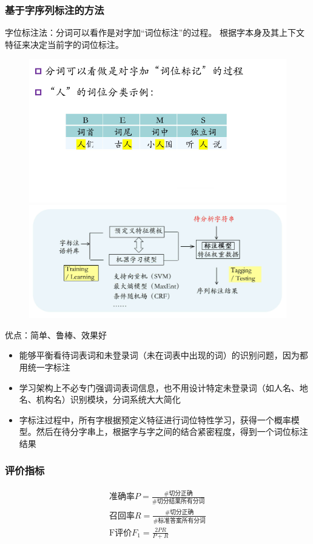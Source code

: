 \subsubsection{基于字序列标注的方法}
字位标注法：分词可以看作是对字加``词位标注''的过程。
根据字本身及其上下文特征来决定当前字的词位标注。
\begin{figure}[H]
\centering
\includegraphics[width=0.6\linewidth]{fig/word_pos_labeling.png}
\includegraphics[width=0.6\linewidth]{fig/word_seq_labeling.png}
\end{figure}

优点：简单、鲁棒、效果好
\begin{itemize}
	\item 能够平衡看待词表词和未登录词（未在词表中出现的词）的识别问题，因为都用统一字标注
	\item 学习架构上不必专门强调词表词信息，也不用设计特定未登录词（如人名、地名、机构名）识别模块，分词系统大大简化
	\item 字标注过程中，所有字根据预定义特征进行词位特性学习，获得一个概率模型。然后在待分字串上，根据字与字之间的结合紧密程度，得到一个词位标注结果
\end{itemize}

\subsubsection{评价指标}
\[\begin{aligned}
\text{准确率}P=\frac{\#\text{切分正确}}{\#\text{切分结果所有分词}}\\
\text{召回率}R=\frac{\#\text{切分正确}}{\#\text{标准答案所有分词}}\\
\text{F评价}F_1=\frac{2PR}{P+R}
\end{aligned}\]